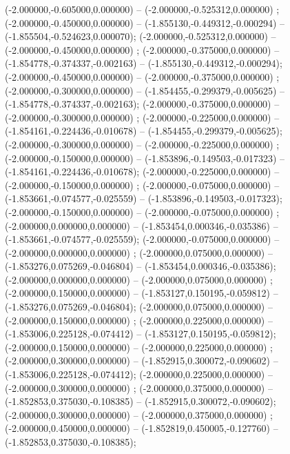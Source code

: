  (-2.000000,-0.605000,0.000000) -- (-2.000000,-0.525312,0.000000) ;
 (-2.000000,-0.450000,0.000000) -- (-1.855130,-0.449312,-0.000294) -- (-1.855504,-0.524623,0.000070);
 (-2.000000,-0.525312,0.000000) -- (-2.000000,-0.450000,0.000000) ;
 (-2.000000,-0.375000,0.000000) -- (-1.854778,-0.374337,-0.002163) -- (-1.855130,-0.449312,-0.000294);
 (-2.000000,-0.450000,0.000000) -- (-2.000000,-0.375000,0.000000) ;
 (-2.000000,-0.300000,0.000000) -- (-1.854455,-0.299379,-0.005625) -- (-1.854778,-0.374337,-0.002163);
 (-2.000000,-0.375000,0.000000) -- (-2.000000,-0.300000,0.000000) ;
 (-2.000000,-0.225000,0.000000) -- (-1.854161,-0.224436,-0.010678) -- (-1.854455,-0.299379,-0.005625);
 (-2.000000,-0.300000,0.000000) -- (-2.000000,-0.225000,0.000000) ;
 (-2.000000,-0.150000,0.000000) -- (-1.853896,-0.149503,-0.017323) -- (-1.854161,-0.224436,-0.010678);
 (-2.000000,-0.225000,0.000000) -- (-2.000000,-0.150000,0.000000) ;
 (-2.000000,-0.075000,0.000000) -- (-1.853661,-0.074577,-0.025559) -- (-1.853896,-0.149503,-0.017323);
 (-2.000000,-0.150000,0.000000) -- (-2.000000,-0.075000,0.000000) ;
 (-2.000000,0.000000,0.000000) -- (-1.853454,0.000346,-0.035386) -- (-1.853661,-0.074577,-0.025559);
 (-2.000000,-0.075000,0.000000) -- (-2.000000,0.000000,0.000000) ;
 (-2.000000,0.075000,0.000000) -- (-1.853276,0.075269,-0.046804) -- (-1.853454,0.000346,-0.035386);
 (-2.000000,0.000000,0.000000) -- (-2.000000,0.075000,0.000000) ;
 (-2.000000,0.150000,0.000000) -- (-1.853127,0.150195,-0.059812) -- (-1.853276,0.075269,-0.046804);
 (-2.000000,0.075000,0.000000) -- (-2.000000,0.150000,0.000000) ;
 (-2.000000,0.225000,0.000000) -- (-1.853006,0.225128,-0.074412) -- (-1.853127,0.150195,-0.059812);
 (-2.000000,0.150000,0.000000) -- (-2.000000,0.225000,0.000000) ;
 (-2.000000,0.300000,0.000000) -- (-1.852915,0.300072,-0.090602) -- (-1.853006,0.225128,-0.074412);
 (-2.000000,0.225000,0.000000) -- (-2.000000,0.300000,0.000000) ;
 (-2.000000,0.375000,0.000000) -- (-1.852853,0.375030,-0.108385) -- (-1.852915,0.300072,-0.090602);
 (-2.000000,0.300000,0.000000) -- (-2.000000,0.375000,0.000000) ;
 (-2.000000,0.450000,0.000000) -- (-1.852819,0.450005,-0.127760) -- (-1.852853,0.375030,-0.108385);
